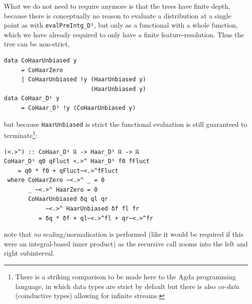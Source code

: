 \documentclass[sigplan,review,anonymous]{acmart}\settopmatter{printfolios=true,printccs=false,printacmref=false}
\theoremstyle{acmplain}
\theoremstyle{acmdefinition}
\begin{document}
What we do not need to require anymore is that the trees have finite depth, because there is conceptually no reason to evaluate a distribution at a single point as with \lstinline`evalPreIntg_D¹`, but only as a functional with a whole function, which we have already required to only have a finite feature-resolution. Thus the tree can be non-strict,
\begin{lstlisting}
data CoHaarUnbiased y
     = CoHaarZero
     | CoHaarUnbiased !y (HaarUnbiased y)
                         (HaarUnbiased y)
data CoHaar_D¹ y
     = CoHaar_D¹ !y (CoHaarUnbiased y)
\end{lstlisting}
but because \lstinline`HaarUnbiased` is strict the functional evaluation is still guaranteed to terminate\footnote{%
There is a striking comparison to be made here to the Agda programming language, in which data types are strict by default but there is also \emph{co-data} (coinductive types) allowing for infinite streams.
}:
\begin{lstlisting}
(<.>^) :: CoHaar_D¹ ℝ -> Haar_D¹ ℝ -> ℝ
CoHaar_D¹ q0 qFluct <.>^ Haar_D¹ f0 fFluct
    = q0 * f0 + qFluct~<.>^fFluct
 where CoHaarZero ~<.>^ _ = 0
       _ ~<.>^ HaarZero = 0
       CoHaarUnbiased δq ql qr
            ~<.>^ HaarUnbiased δf fl fr
          = δq * δf + ql~<.>^fl + qr~<.>^fr
\end{lstlisting}
note that \emph{no} scaling/normalisation is performed (like it would be required if this were an integral-based inner product) as the recursive call zooms into the left and right subinterval.
\end{document}
